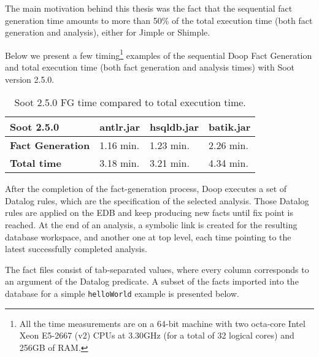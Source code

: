 \documentclass{dithesis}
\begin{document}
        The main motivation behind this thesis was the fact that the sequential fact generation time amounts to more than 50\% of the total execution time (both fact generation and analysis), either for Jimple or Shimple.


        Below we present a few timing\footnote{All the time measurements are on a 64-bit machine with two octa-core Intel Xeon E5-2667 (v2) CPUs at 3.30GHz (for a total of 32 logical cores) and 256GB of RAM.} examples of the sequential Doop Fact Generation and total execution time (both fact generation and analysis times) with Soot version 2.5.0.

        \begin{table}[H]
            \centering
                \begin{tabular}{llll}
                \hline
                \textbf{Soot 2.5.0}      & \textbf{antlr.jar} & \textbf{hsqldb.jar} & \textbf{batik.jar} \\ \hline
                \textbf{Fact Generation} & 1.16 min.          & 1.23 min.           & 2.26 min.          \\
                \textbf{Total time}      & 3.18 min.          & 3.21 min.           & 4.34 min.          \\ \hline
                \end{tabular}
                \newline
            \caption[Soot 2.5.0 FG times]{Soot 2.5.0 FG time compared to total execution time.}
        \end{table}

    	After the completion of the fact-generation process, Doop executes a set of Datalog rules, which are the specification of the selected analysis. Those Datalog rules are applied on the EDB and keep producing new facts until fix point is reached. At the end of an analysis, a symbolic link is created for the resulting database workspace, and another one at top level, each time pointing to the latest successfully completed analysis.

        The fact files consist of tab-separated values, where every column corresponds to an argument of the Datalog predicate. 
        A subset of the facts imported into the database for a simple \texttt{helloWorld} example is presented below. \\
        
\end{document}
